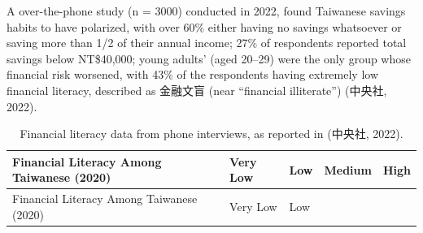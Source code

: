 \documentclass[
  12pt,
  letterpaper,
  DIV=11,
  numbers=noendperiod]{scrartcl}
\begin{document}
A over-the-phone study (n = 3000) conducted in 2022, found Taiwanese
savings habits to have polarized, with over 60\% either having no
savings whatsoever or saving more than 1/2 of their annual income; 27\%
of respondents reported total savings below NT\$40,000; young adults'
(aged 20--29) were the only group whose financial risk worsened, with
43\% of the respondents having extremely low financial literacy,
described as 金融文盲 (near ``financial illiterate'') (中央社, 2022).

\def\pandoctableshortcapt{Financial Literacy Data from Phone Interviews}

\begin{longtable}[]{@{}
  >{\raggedright\arraybackslash}p{}
  >{\raggedleft\arraybackslash}p{}
  >{\raggedleft\arraybackslash}p{}
  >{\raggedleft\arraybackslash}p{}
  >{\raggedleft\arraybackslash}p{}@{}}
\caption[Financial Literacy Data from Phone Interviews]{Financial
literacy data from phone interviews, as reported in (中央社,
2022).}\tabularnewline
\toprule\noalign{}
\begin{minipage}[b]{\linewidth}\raggedright
Financial Literacy Among Taiwanese (2020)
\end{minipage} & \begin{minipage}[b]{\linewidth}\raggedleft
Very Low
\end{minipage} & \begin{minipage}[b]{\linewidth}\raggedleft
Low
\end{minipage} & \begin{minipage}[b]{\linewidth}\raggedleft
Medium
\end{minipage} & \begin{minipage}[b]{\linewidth}\raggedleft
High
\end{minipage} \\
\midrule\noalign{}
\endfirsthead
\toprule\noalign{}
\begin{minipage}[b]{\linewidth}\raggedright
Financial Literacy Among Taiwanese (2020)
\end{minipage} & \begin{minipage}[b]{\linewidth}\raggedleft
Very Low
\end{minipage} & \begin{minipage}[b]{\linewidth}\raggedleft
Low
\end{minipage} & \begin{minipage}[b]{\linewidth}\raggedleft

\end{minipage}
\end{longtable}
\end{document}
